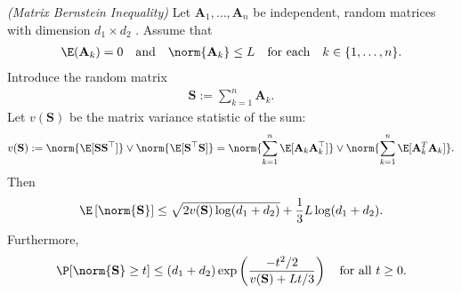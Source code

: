 



\begin{theorem}
  \emph{(Matrix Bernstein Inequality)}
  \label{rmineq_bernstein}
  Let $\mathbf{A}_1, \ldots, \mathbf{A}_n$ be independent, random matrices with dimension 
  $d_1 \times d_2$
  . Assume that
    \begin{gather}
      \label{rmineq_bernstein_cond_1}
      \E(\mathbf{A}_k)=0\quad\text{and}\quad\norm{\mathbf{A}_k}\le L \quad \text{for each}\quad  k\in \{1,\ldots,n\}.
    \end{gather}
    Introduce the random matrix
      \begin{gather*}
        \mathbf{S}:=\sum_{k=1}^n \mathbf{A}_k.
      \end{gather*}
    Let $v(\mathbf{S})$ be the matrix variance statistic of the sum:
      \begin{align}
        \label{rmineq_bernstein_cond_2}
        v(\mathbf{S}):= \norm{\E[\mathbf{S}\mathbf{S}^\top ]} \lor \norm{\E[\mathbf{S}^\top \mathbf{S}]} 
             = \norm{\sum_{k=1}^n\E[\mathbf{A}_k\mathbf{A}_k^\top]} \lor \norm{\sum_{k=1}^n\E[\mathbf{A}_k^T \mathbf{A}_k]} .
      \end{align}
    Then
      \begin{align}
        \label{rmineq_bernstein_expectation_bound}
        \E \left[ \norm{\mathbf{S}} \right]\le \sqrt{2v(\mathbf{S})\log(d_1+d_2)} + \frac{1}{3}L\log(d_1+d_2).
      \end{align}
    Furthermore, 
      \begin{gather}
        \label{rmineq_bernstein_probability_bound}
        \P[\norm{\mathbf{S}}\ge t]\le(d_1+d_2)\exp\left(\frac{-t^2/2}{v(\mathbf{S})+Lt/3} \right)
        \quad
        \text{for all $t \ge 0$}
        .
      \end{gather}
\end{theorem}

